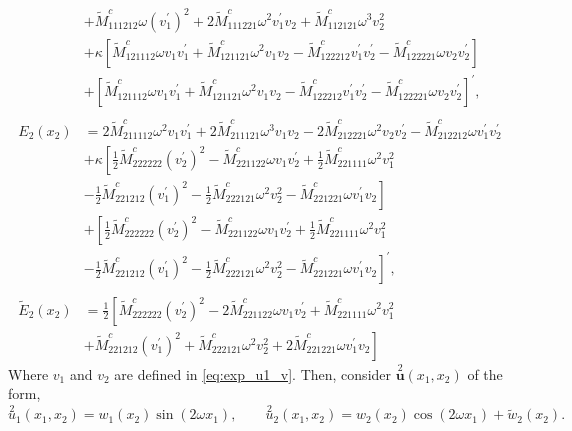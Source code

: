 \documentclass[11pt]{report}
\begin{document}
\begin{appendices}
\begin{equation}
\begin{aligned}
&+ \tilde{M}^c_{111212} \omega (v_1^\prime)^2 +  2 \tilde{M}^c_{111221} \omega^2 v_1^\prime v_2 + \tilde{M}^c_{112121} \omega^3 v_2^2 \\
&+ \kappa \left[ \tilde{M}^c_{121112} \omega v_1 v_1^\prime + \tilde{M}^c_{121121} \omega^2 v_1 v_2 - \tilde{M}^c_{122212} v_1^\prime v_2^\prime - \tilde{M}^c_{122221} \omega v_2 v_2^\prime \right] \\
&+ \left[ \tilde{M}^c_{121112} \omega v_1 v_1^\prime + \tilde{M}^c_{121121} \omega^2 v_1 v_2 - \tilde{M}^c_{122212} v_1^\prime v_2^\prime - \tilde{M}^c_{122221} \omega v_2 v_2^\prime \right]^\prime, \\
\\
E_2(x_2) &= 2\tilde{M}^c_{211112} \omega^2 v_1 v_1^\prime + 2\tilde{M}^c_{211121} \omega^3 v_1 v_2 - 2 \tilde{M}^c_{212221} \omega^2 v_2 v_2^\prime - \tilde{M}^c_{212212} \omega v_1^\prime v_2^\prime \\
&+ \kappa \left[ \frac{1}{2} \tilde{M}^c_{222222} (v_2^\prime)^2 - \tilde{M}^c_{221122} \omega v_1 v_2^\prime + \frac{1}{2} \tilde{M}^c_{221111} \omega^2 v_1^2 \right. \\
&- \left. \frac{1}{2} \tilde{M}^c_{221212} (v_1^\prime)^2 - \frac{1}{2} \tilde{M}^c_{222121} \omega^2 v_2^2 - \tilde{M}^c_{221221} \omega v_1^\prime v_2 \right] \\
&+ \left[ \frac{1}{2} \tilde{M}^c_{222222} (v_2^\prime)^2 - \tilde{M}^c_{221122} \omega v_1 v_2^\prime + \frac{1}{2} \tilde{M}^c_{221111} \omega^2 v_1^2 \right. \\
&- \left. \frac{1}{2} \tilde{M}^c_{221212} (v_1^\prime)^2 - \frac{1}{2} \tilde{M}^c_{222121} \omega^2 v_2^2 - \tilde{M}^c_{221221} \omega v_1^\prime v_2 \right]^\prime, \\
\\
\widetilde{E}_2(x_2) &= \frac{1}{2} \left [ \tilde{M}^c_{222222} (v_2^\prime)^2 - 2 \tilde{M}^c_{221122} \omega v_1 v_2^\prime + \tilde{M}^c_{221111} \omega^2 v_1^2 \right. \\
&+ \left. \tilde{M}^c_{221212} (v_1^\prime)^2 + \tilde{M}^c_{222121} \omega^2 v_2^2 + 2 \tilde{M}^c_{221221} \omega v_1^\prime v_2 \right ]
\end{aligned}
\end{equation}
Where $v_1$ and $v_2$ are defined in \eqref{eq:exp_u1_v}. Then, consider $\overset{2}{\mathbf{u}}(x_1, x_2)$ of the form,
\begin{equation} \label{eq:u2_exp_form}
\overset{2}{u}_1(x_1, x_2) = w_1(x_2) \sin(2 \omega x_1), \qquad \overset{2}{u}_2(x_1, x_2) = w_2(x_2) \cos(2\omega x_1) + \widetilde{w}_2(x_2).

\end{equation}
\end{appendices}
\end{document}
